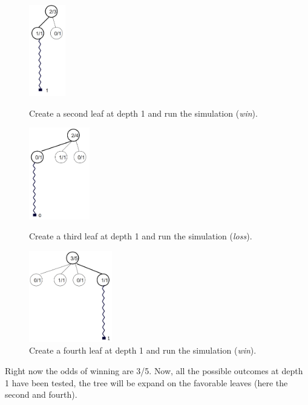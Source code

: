 \begin{figure}[H]
\centering
	\begin{minipage}[b]{0.3\linewidth}
		\centering
		\includegraphics[height=4cm]{1_Presentation/1.2_Algorithm_MCTS_Benoit/img/3.png}
		\caption{\label{fig:3}Create a second leaf at depth 1 and run the simulation (\textit{win}).}
	\end{minipage}%
	\hspace*{1cm}
	\begin{minipage}[b]{0.3\linewidth}
		\centering
		\includegraphics[height=4cm]{1_Presentation/1.2_Algorithm_MCTS_Benoit/img/4.png}
		\caption{\label{fig:4}Create a third leaf at depth 1 and run the simulation (\textit{loss}).}
	\end{minipage}%
	\hspace*{1cm}
	\begin{minipage}[b]{0.3\linewidth}
		\centering
		\includegraphics[height=4cm]{1_Presentation/1.2_Algorithm_MCTS_Benoit/img/5.png}
		\caption{\label{fig:5}Create a fourth leaf at depth 1 and run the simulation (\textit{win}).}
	\end{minipage}%
\end{figure}

Right now the odds of winning are 3/5. Now,  all the possible outcomes at depth 1 have been tested, the tree will be expand on the favorable leaves (here the second and fourth).

